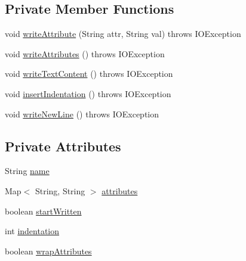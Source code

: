 \subsection*{Private Member Functions}
\begin{DoxyCompactItemize}
\item 
void \hyperlink{classorg_1_1coode_1_1xml_1_1_x_m_l_writer_impl_1_1_x_m_l_element_add5fca640438179f6e1bd43ca8b57182}{write\-Attribute} (String attr, String val)  throws I\-O\-Exception 
\item 
void \hyperlink{classorg_1_1coode_1_1xml_1_1_x_m_l_writer_impl_1_1_x_m_l_element_a5b499dfde8ebd33d44cd577829fd5916}{write\-Attributes} ()  throws I\-O\-Exception 
\item 
void \hyperlink{classorg_1_1coode_1_1xml_1_1_x_m_l_writer_impl_1_1_x_m_l_element_a1f5f7c12bc5c8afe99479fe71b41f320}{write\-Text\-Content} ()  throws I\-O\-Exception 
\item 
void \hyperlink{classorg_1_1coode_1_1xml_1_1_x_m_l_writer_impl_1_1_x_m_l_element_a929af5bea44d19dbd72fd22a59e0b099}{insert\-Indentation} ()  throws I\-O\-Exception 
\item 
void \hyperlink{classorg_1_1coode_1_1xml_1_1_x_m_l_writer_impl_1_1_x_m_l_element_af143f1b17a33232d95f7bfbe5aae1364}{write\-New\-Line} ()  throws I\-O\-Exception 
\end{DoxyCompactItemize}
\subsection*{Private Attributes}
\begin{DoxyCompactItemize}
\item 
String \hyperlink{classorg_1_1coode_1_1xml_1_1_x_m_l_writer_impl_1_1_x_m_l_element_a565d2d6336e28710f569f86f16f2612f}{name}
\item 
Map$<$ String, String $>$ \hyperlink{classorg_1_1coode_1_1xml_1_1_x_m_l_writer_impl_1_1_x_m_l_element_a94f115730e030772731785416dcd91cb}{attributes}
\item 
boolean \hyperlink{classorg_1_1coode_1_1xml_1_1_x_m_l_writer_impl_1_1_x_m_l_element_a0764dcd4756a8cbb67a9645f7e6841d6}{start\-Written}
\item 
int \hyperlink{classorg_1_1coode_1_1xml_1_1_x_m_l_writer_impl_1_1_x_m_l_element_a82425e44b543f2e3291aa5539766241f}{indentation}
\item 
boolean \hyperlink{classorg_1_1coode_1_1xml_1_1_x_m_l_writer_impl_1_1_x_m_l_element_a5cf8076013ee1155f65b7110b1412a17}{wrap\-Attributes}
\end{DoxyCompactItemize}


